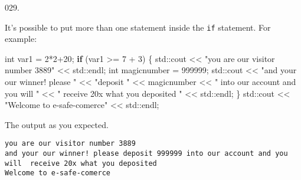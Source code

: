 \documentclass[]{book}
\newenvironment{Shaded}{}{}
\newcommand{\BuiltInTok}[1]{#1}
\newcommand{\ControlFlowTok}[1]{\textcolor[rgb]{0.00,0.44,0.13}{\textbf{#1}}}
\newcommand{\DataTypeTok}[1]{\textcolor[rgb]{0.56,0.13,0.00}{#1}}
\newcommand{\DecValTok}[1]{\textcolor[rgb]{0.25,0.63,0.44}{#1}}
\newcommand{\NormalTok}[1]{#1}
\newcommand{\StringTok}[1]{\textcolor[rgb]{0.25,0.44,0.63}{#1}}
\begin{document}
\begin{minipage}{\linewidth}
\begin{minipage}[t]{.485\linewidth}
\begin{framed}
\end{framed}

\end{minipage}
\end{minipage}

\vspace{2mm}\noindent\hrulefill{}

\begin{minipage}{\linewidth}\noindent
{\tiny 029.}\\
\begin{minipage}[t]{.485\linewidth}

It's possible to put more than one statement inside the \texttt{if}
statement. For example:

\begin{framed}

\begin{Shaded}
\begin{Highlighting}[]
\DataTypeTok{int}\NormalTok{ var1 = }\DecValTok{2}\NormalTok{*}\DecValTok{2+20}\NormalTok{;}
\ControlFlowTok{if}\NormalTok{ (var1 >= }\DecValTok{7}\NormalTok{ + }\DecValTok{3}\NormalTok{) \{}
  \BuiltInTok{std::}\NormalTok{cout}
\NormalTok{    << }\StringTok{"you are our visitor number 3889"}
\NormalTok{    << }\BuiltInTok{std::}\NormalTok{endl;}
  \DataTypeTok{int}\NormalTok{ magicnumber = }\DecValTok{999999}\NormalTok{;}
  \BuiltInTok{std::}\NormalTok{cout}
\NormalTok{    << }\StringTok{"and your our winner! please "}
\NormalTok{    << }\StringTok{"deposit "}\NormalTok{ << magicnumber}
\NormalTok{    << }\StringTok{" into our account and you will "}
\NormalTok{    << }\StringTok{" receive 20x what you deposited "}
\NormalTok{    << }\BuiltInTok{std::}\NormalTok{endl;}
\NormalTok{\}}
\BuiltInTok{std::}\NormalTok{cout}
\NormalTok{  << }\StringTok{"Welcome to e-safe-comerce"}
\NormalTok{  << }\BuiltInTok{std::}\NormalTok{endl;}
\end{Highlighting}
\end{Shaded}

\end{framed}

\end{minipage}
\hfill
\begin{minipage}[t]{.485\linewidth}

The output as you expected.

\begin{framed}

\begin{verbatim}
you are our visitor number 3889
and your our winner! please deposit 999999 into our account and you will  receive 20x what you deposited 
Welcome to e-safe-comerce
\end{verbatim}

\end{framed}

\end{minipage}
\end{minipage}
\end{document}
